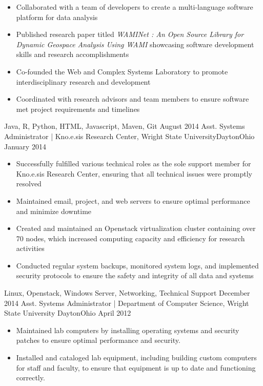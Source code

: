\begin{experiences}
{\begin{itemize}
          \item Collaborated with a team of developers to create a multi-language software platform for data analysis
          \item Published research paper titled \textit{WAMINet : An Open Source Library for Dynamic Geospace Analysis Using WAMI} showcasing software development skills and research accomplishments
          \item Co-founded the Web and Complex Systems Laboratory to promote interdisciplinary research and development
          \item Coordinated with research advisors and team members to ensure software met project requirements and timelines
      \end{itemize}
  }
  {Java, R, Python, HTML, Javascript, Maven, Git}
  \emptySeparator
  \experience
  {August 2014} {Asst. Systems Administrator | Kno.e.sis Research Center, Wright State University}{Dayton}{Ohio}
  {January 2014} {
      \begin{itemize}
          \item Successfully fulfilled various technical roles as the sole support member for Kno.e.sis Research Center, ensuring that all technical issues were promptly resolved
          \item Maintained email, project, and web servers to ensure optimal performance and minimize downtime
          \item Created and maintained an Openstack virtualization cluster containing over 70 nodes, which increased computing capacity and efficiency for research activities
          \item Conducted regular system backups, monitored system logs, and implemented security protocols to ensure the safety and integrity of all data and systems
      \end{itemize}
  }
  {Linux, Openstack, Windows Server, Networking, Technical Support}
  \emptySeparator
  \experience
  {December 2014} { Asst. Systems Administrator | Department of Computer Science, Wright State University }{Dayton}{Ohio}
  {April 2012}    {
      \begin{itemize}
          \item Maintained lab computers by installing operating systems and security patches to ensure optimal performance and security.
          \item Installed and cataloged lab equipment, including building custom computers for staff and faculty, to ensure that equipment is up to date and functioning correctly.

\end{itemize}}
\end{experiences}

